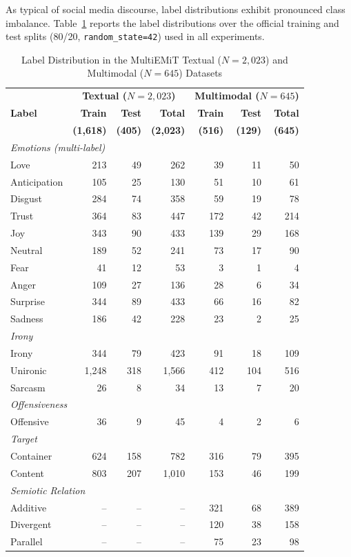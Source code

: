 As typical of social media discourse, label distributions exhibit pronounced class imbalance. Table~\ref{table:text_dist} reports the label distributions over the official training and test splits (80/20, \texttt{random\_state=42}) used in all experiments.

\begin{table}[!t]
\centering
\caption{Label Distribution in the MultiEMiT Textual ($N = 2,023$) and Multimodal ($N = 645$) Datasets}
\label{table:text_dist}
\footnotesize
\setlength{\tabcolsep}{3.5pt}
\renewcommand{\arraystretch}{1.05}
\begin{tabular}{l | r r r | r r r}
\hline
 & \multicolumn{3}{c|}{\textbf{Textual ($N = 2,023$)}} & \multicolumn{3}{c}{\textbf{Multimodal ($N = 645$)}} \\
\textbf{Label} & \textbf{Train} & \textbf{Test} & \textbf{Total} & \textbf{Train} & \textbf{Test} & \textbf{Total} \\
 & \textbf{(1,618)} & \textbf{(405)} & \textbf{(2,023)} & \textbf{(516)} & \textbf{(129)} & \textbf{(645)} \\
\hline
\multicolumn{7}{l}{\textit{Emotions (multi-label)}} \\
\hline
Love & 213 & 49 & 262 & 39 & 11 & 50 \\
Anticipation & 105 & 25 & 130 & 51 & 10 & 61 \\
Disgust & 284 & 74 & 358 & 59 & 19 & 78 \\
Trust & 364 & 83 & 447 & 172 & 42 & 214 \\
Joy & 343 & 90 & 433 & 139 & 29 & 168 \\
Neutral & 189 & 52 & 241 & 73 & 17 & 90 \\
Fear & 41 & 12 & 53 & 3 & 1 & 4 \\
Anger & 109 & 27 & 136 & 28 & 6 & 34 \\
Surprise & 344 & 89 & 433 & 66 & 16 & 82 \\
Sadness & 186 & 42 & 228 & 23 & 2 & 25 \\
\hline
\multicolumn{7}{l}{\textit{Irony}} \\
\hline
Irony & 344 & 79 & 423 & 91 & 18 & 109 \\
Unironic & 1,248 & 318 & 1,566 & 412 & 104 & 516 \\
Sarcasm & 26 & 8 & 34 & 13 & 7 & 20 \\
\hline
\multicolumn{7}{l}{\textit{Offensiveness}} \\
\hline
Offensive & 36 & 9 & 45 & 4 & 2 & 6 \\
\hline
\multicolumn{7}{l}{\textit{Target}} \\
\hline
Container & 624 & 158 & 782 & 316 & 79 & 395 \\
Content & 803 & 207 & 1,010 & 153 & 46 & 199 \\
\hline
\multicolumn{7}{l}{\textit{Semiotic Relation}} \\
\hline
Additive & -- & -- & -- & 321 & 68 & 389 \\
Divergent & -- & -- & -- & 120 & 38 & 158 \\
Parallel & -- & -- & -- & 75 & 23 & 98 \\
\hline
\end{tabular}
\end{table}

